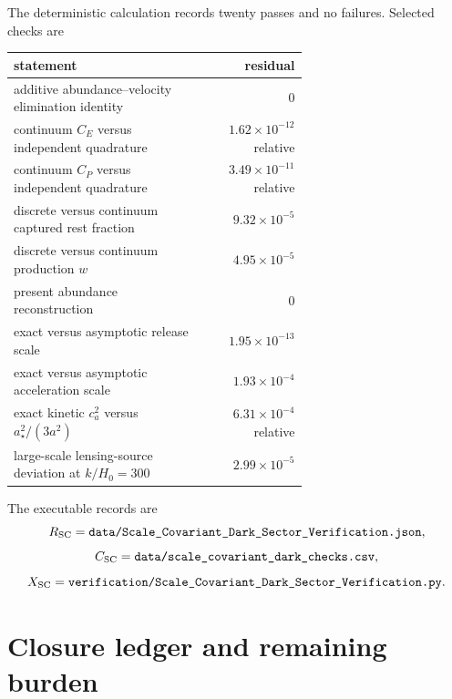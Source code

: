 The deterministic calculation records twenty passes and no failures.  Selected checks are
\begin{center}
\begin{tabular}{p{0.64\linewidth}r}
\toprule
statement & residual\\
\midrule
additive abundance--velocity elimination identity & $0$\\
continuum $C_E$ versus independent quadrature & $1.62\times10^{-12}$ relative\\
continuum $C_P$ versus independent quadrature & $3.49\times10^{-11}$ relative\\
discrete versus continuum captured rest fraction & $9.32\times10^{-5}$\\
discrete versus continuum production $w$ & $4.95\times10^{-5}$\\
present abundance reconstruction & $0$\\
exact versus asymptotic release scale & $1.95\times10^{-13}$\\
exact versus asymptotic acceleration scale & $1.93\times10^{-4}$\\
exact kinetic $c_a^2$ versus $a_\star^2/(3a^2)$ & $6.31\times10^{-4}$ relative\\
large-scale lensing-source deviation at $k/H_0=300$ & $2.99\times10^{-5}$\\
\bottomrule
\end{tabular}
\end{center}
The executable records are
\begin{equation}
 R_{\rm SC}=\texttt{data/Scale\_Covariant\_Dark\_Sector\_Verification.json},
 \label{eq:scw-json-record}
\end{equation}
\begin{equation}
 C_{\rm SC}=\texttt{data/scale\_covariant\_dark\_checks.csv},
 \label{eq:scw-check-record}
\end{equation}
\begin{equation}
 X_{\rm SC}=\texttt{verification/Scale\_Covariant\_Dark\_Sector\_Verification.py}.
 \label{eq:scw-script-record}
\end{equation}

\section{Closure ledger and remaining burden}

